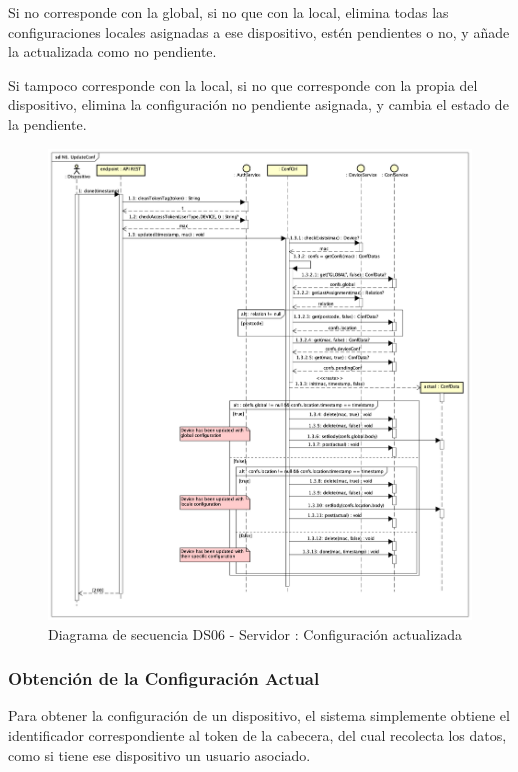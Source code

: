 Si no corresponde con la global, si no que con la local, elimina todas las configuraciones locales asignadas a ese dispositivo, estén pendientes o no, y añade la actualizada como no pendiente.

Si tampoco corresponde con la local, si no que corresponde con la propia del dispositivo, elimina la configuración no pendiente asignada, y cambia el estado de la pendiente.

\begin{figure}[H]
    \centering
    \includegraphics[width=14cm]{./img/sequence/diagram/updateConf.png}
    \caption{Diagrama de secuencia DS06 - Servidor : Configuración actualizada}
    \label{fig:seq.UpdateConf}
\end{figure}

\newpage
\subsubsection{Obtención de la Configuración Actual}

Para obtener la configuración de un dispositivo, el sistema simplemente obtiene el identificador correspondiente al token de la cabecera, del cual recolecta los datos, como si tiene ese dispositivo un usuario asociado.

